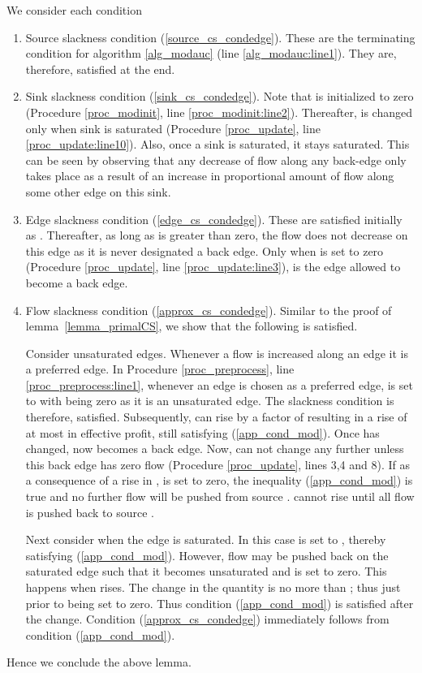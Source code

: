 \documentclass[11pt]{article}
\newenvironment{proof}{\par\noindent{\bf Proof:}}{\mbox{}\hfill\\}
\begin{document}
\begin{proof} We consider each condition  

\begin{enumerate}


\item{Source slackness condition (\ref{source_cs_condedge}).}
These are the terminating 
condition for algorithm \ref{alg_modauc} (line \ref{alg_modauc:line1}). They are, 
therefore, satisfied at the end. 

\item{Sink slackness condition (\ref{sink_cs_condedge}).} 
Note that  is
initialized to zero (Procedure \ref{proc_modinit}, line \ref{proc_modinit:line2}). Thereafter,  is changed
only when sink  is saturated (Procedure \ref{proc_update}, line \ref{proc_update:line10}). 
Also, once a sink is saturated, it stays saturated. This can be seen by observing that any
decrease of flow along any back-edge only takes place as a result of an increase in
proportional amount of flow along some other edge on this sink.

\item{Edge slackness condition (\ref{edge_cs_condedge}).} 
These are satisfied initially as . Thereafter,
as long as  is greater than zero, the flow does not decrease on this edge as
it is never designated a back edge. Only when  is set to zero 
(Procedure \ref{proc_update}, line \ref{proc_update:line3}),
is the edge allowed to become a back edge. 

\item{Flow slackness condition (\ref{approx_cs_condedge}).} 
Similar to the proof of  lemma~\ref{lemma_primalCS}, we show that the following is  satisfied.


Consider unsaturated edges. Whenever a flow is increased along an edge
 it is a preferred edge. In Procedure \ref{proc_preprocess}, line \ref{proc_preprocess:line1},
whenever an edge is chosen as a preferred edge,  is set to  with
 being zero as it is an unsaturated edge. The slackness condition is therefore, satisfied.
Subsequently,  can rise by a factor of  resulting in a rise of at most 
 in effective profit, still satisfying (\ref{app_cond_mod}). Once 
 has changed,  now becomes a back edge. Now,  can not change any further
 unless this back edge has zero flow
(Procedure \ref{proc_update}, lines 3,4 and 8).
If as a consequence of a rise in ,  is set to zero, 
the inequality (\ref{app_cond_mod})
is true and  no further flow will be pushed from source . 
 cannot rise until all flow is pushed back to source .

Next consider  when the edge is saturated.
In this case  is set to , thereby 
satisfying (\ref{app_cond_mod}).
However, flow may be pushed back on the saturated edge such that it
becomes unsaturated and  is 
set to zero. This happens when  rises. The change in the quantity 
 is no more than ; thus
  just prior to being set to zero. Thus
condition (\ref{app_cond_mod}) is satisfied after the change.
Condition (\ref{approx_cs_condedge}) immediately follows from condition (\ref{app_cond_mod}).  

\end{enumerate}
Hence we conclude the above lemma.
\end{proof}
\end{document}
